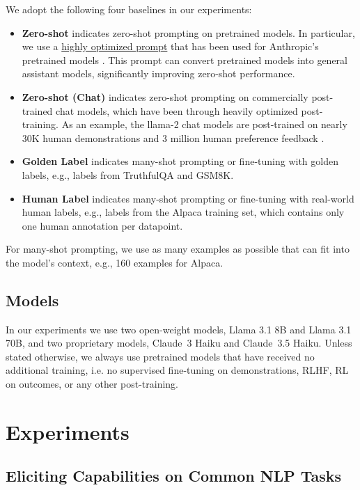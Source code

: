 \documentclass{article}
\begin{document}
We adopt the following four baselines in our experiments:
\begin{itemize}[leftmargin=*, topsep=0pt, itemsep=-1pt]
    \item \textbf{Zero-shot} indicates zero-shot prompting on pretrained models. In particular, we use a \href{https://gist.github.com/jareddk/2509330f8ef3d787fc5aaac67aab5f11#file-hhh_prompt-txt}{highly optimized prompt} that has been used for Anthropic's pretrained models \citep{askell2021general}. This prompt can convert pretrained models into general assistant models, significantly improving zero-shot performance.
    \item \textbf{Zero-shot (Chat)} indicates zero-shot prompting on commercially post-trained chat models, which have been through heavily optimized post-training. As an example, the llama-2 chat models are post-trained on nearly 30K human demonstrations and 3 million human preference feedback \citep{touvron2023llama}.
    \item \textbf{Golden Label} indicates many-shot prompting or fine-tuning with golden labels, e.g., labels from TruthfulQA and GSM8K.
    \item \textbf{Human Label} indicates many-shot prompting or fine-tuning with real-world human labels, e.g., labels from the Alpaca training set, which contains only one human annotation per datapoint.
\end{itemize}

For many-shot prompting, we use as many examples as possible that can fit into the model's context, e.g., 160 examples for Alpaca.

\subsection{Models}

In our experiments we use two open-weight models, Llama 3.1 8B and Llama 3.1 70B, and two proprietary models, Claude~3 Haiku and Claude~3.5 Haiku. Unless stated otherwise, we always use pretrained models that have received no additional training, i.e. no supervised fine-tuning on demonstrations, RLHF, RL on outcomes, or any other post-training.

\section{Experiments} \label{sec:experiments}
\subsection{Eliciting Capabilities on Common NLP Tasks} \label{sec:nlp_results}
\end{document}
